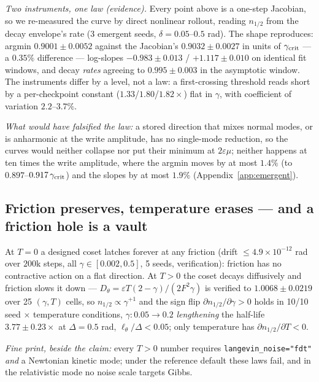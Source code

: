 \documentclass{article}
\begin{document}
\emph{Two instruments, one law (evidence).} Every point above is a one-step Jacobian, so we re-measured the curve by direct nonlinear rollout, reading $n_{1/2}$ from the decay envelope's rate (3 emergent seeds, $\delta=0.05$--$0.5$ rad). The shape reproduces: argmin $0.9001\pm0.0052$ against the Jacobian's $0.9032\pm0.0027$ in units of $\gamma_{\rm crit}$ --- a $0.35\%$ difference --- log-slopes $-0.983\pm0.013$ / $+1.117\pm0.010$ on identical fit windows, and decay \emph{rates} agreeing to $0.995\pm0.003$ in the asymptotic window. The instruments differ by a level, not a law: a first-crossing threshold reads short by a per-checkpoint constant ($1.33$/$1.80$/$1.82\times$) flat in $\gamma$, with coefficient of variation $2.2$--$3.7\%$. {\footnotesize\emph{What would have falsified the law:} a stored direction that mixes normal modes, or is anharmonic at the write amplitude, has no single-mode reduction, so the curves would neither collapse nor put their minimum at $2\varepsilon\mu$; neither happens at ten times the write amplitude, where the argmin moves by at most $1.4\%$ (to $0.897$--$0.917\,\gamma_{\rm crit}$) and the slopes by at most $1.9\%$ (Appendix~\ref{app:emergent}).\par}

\subsection{Friction preserves, temperature erases --- and a friction hole is a vault}\label{sec:vault}

At $T=0$ a designed coset latches forever at any friction (drift $\le4.9\times10^{-12}$ rad over $200$k steps, all $\gamma\in[0.002,0.5]$, 5 seeds, verification): friction has no contractive action on a flat direction. At $T>0$ the coset decays diffusively and friction slows it down --- $D_\theta=\varepsilon T(2-\gamma)/(2F^2\gamma)$ is verified to $1.0068\pm0.0219$ over 25 $(\gamma,T)$ cells, so $n_{1/2}\propto\gamma^{+1}$ and the sign flip $\partial n_{1/2}/\partial\gamma>0$ holds in 10/10 seed $\times$ temperature conditions, $\gamma:0.05\to0.2$ \emph{lengthening} the half-life $3.77\pm0.23\times$ at $\Delta=0.5$ rad, $\ell_\theta/\Delta<0.05$; only temperature has $\partial n_{1/2}/\partial T<0$. {\footnotesize\emph{Fine print, beside the claim:} every $T>0$ number requires \texttt{langevin\_noise="fdt"} \emph{and} a Newtonian kinetic mode; under the reference default these laws fail, and in the relativistic mode no noise scale targets Gibbs.\par}
\end{document}
